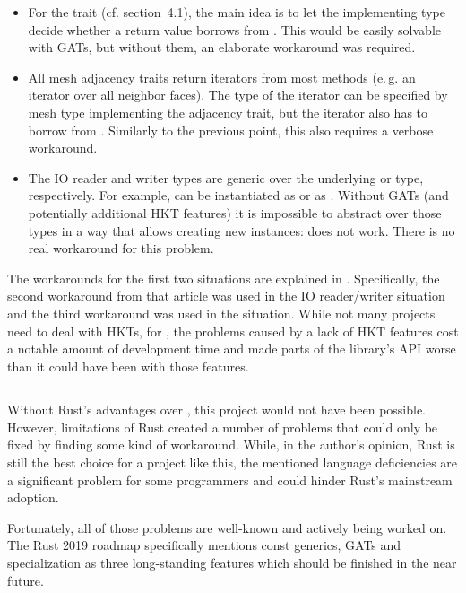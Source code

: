 \begin{itemize}
  \item For the  trait (cf. section~4.1), the main idea is to let the implementing type decide whether a return value borrows from .
  This would be easily solvable with GATs, but without them, an elaborate workaround was required.
  \item All mesh adjacency traits return iterators from most methods (e.\,g. an iterator over all neighbor faces).
  The type of the iterator can be specified by mesh type implementing the adjacency trait, but the iterator also has to borrow from .
  Similarly to the previous point, this also requires a verbose workaround.
  \item The IO reader and writer types are generic over the underlying  or  type, respectively.
  For example,  can be instantiated as  or as .
  Without GATs (and potentially additional HKT features) it is impossible to abstract over those types in a way that allows creating new instances:  does not work.
  There is no real workaround for this problem.
\end{itemize}

The workarounds for the first two situations are explained in \cite{gatworkaround}.
Specifically, the second workaround from that article was used in the IO reader/writer situation and the third workaround was used in the  situation.
While not many projects need to deal with HKTs, for , the problems caused by a lack of HKT features cost a notable amount of development time and made parts of the library's API worse than it could have been with those features.

\vfill

\begin{center}
\rule{.8\textwidth}{.15mm}
\end{center}

Without Rust's advantages over \cpp, this project would not have been possible.
However, limitations of Rust created a number of problems that could only be fixed by finding some kind of workaround.
While, in the author's opinion, Rust is still the best choice for a project like this, the mentioned language deficiencies are a significant problem for some programmers and could hinder Rust's mainstream adoption.

Fortunately, all of those problems are well-known and actively being worked on.
The Rust 2019 roadmap \cite{rfc2657} specifically mentions const generics, GATs and specialization as three long-standing features which should be finished in the near future.

\vspace{1cm}


%
